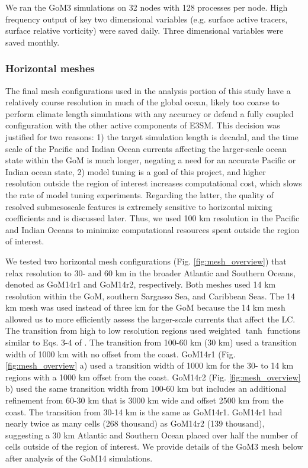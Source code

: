 We ran the GoM3 simulations on 32 nodes with 128 processes per node. High frequency output of key two dimensional variables (e.g. surface active tracers, surface relative vorticity) were saved daily. Three dimensional variables were saved monthly.  

\subsubsection{Horizontal meshes}
The final mesh configurations used in the analysis portion of this study have a relatively course resolution in much of the global ocean, likely too coarse to perform climate length simulations with any accuracy or defend a fully coupled configuration with the other active components of E3SM. This decision was justified for two reasons: 1) the target simulation length is decadal, and the time scale of the Pacific and Indian Ocean currents affecting the larger-scale ocean state within the GoM is much longer, negating a need for an accurate Pacific or Indian ocean state, 2) model tuning is a goal of this project, and higher resolution outside the region of interest increases computational cost, which slows the rate of model tuning experiments. Regarding the latter, the quality of resolved submesoscale features is extremely sensitive to horizontal mixing coefficients and is discussed later. Thus, we used 100 km resolution in the Pacific and Indian Oceans to minimize computational resources spent outside the region of interest. 

We tested two horizontal mesh configurations (Fig. \ref{fig:mesh_overview}) that relax resolution to 30- and 60 km in the broader Atlantic and Southern Oceans, denoted as GoM14r1 and GoM14r2, respectively. Both meshes used 14 km resolution within the GoM, southern Sargasso Sea, and Caribbean Seas. The 14 km mesh was used instead of three km for the GoM because the 14 km mesh allowed us to more efficiently assess the larger-scale currents that affect the LC. The transition from high to low resolution regions used weighted $\tanh$ functions similar to Eqs. 3-4 of \cite{hoch2020mpas}. The transition from 100-60 km (30 km) used a transition width of 1000 km with no offset from the coast. GoM14r1 (Fig. \ref{fig:mesh_overview} a) used a transition width of 1000 km for the 30- to 14 km regions with a 1000 km offset from the coast. GoM14r2 (Fig. \ref{fig:mesh_overview} b) used the same transition width from 100-60 km but includes an additional refinement from 60-30 km that is 3000 km wide and offset 2500 km from the coast. The transition from 30-14 km is the same as GoM14r1. GoM14r1 had nearly twice as many cells (268 thousand) as GoM14r2 (139 thousand), suggesting a 30 km Atlantic and Southern Ocean placed over half the number of cells outside of the region of interest. We provide details of the GoM3 mesh below after analysis of the GoM14 simulations. 

